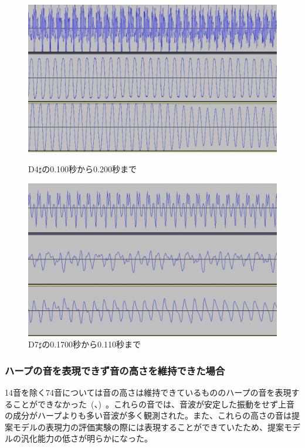 \begin{figure}[b]
\centering
\begin{minipage}[b]{0.48\columnwidth}
\centering
\includegraphics[width=0.85\columnwidth]{figure/66_22_det/d4s_0100_0200.png}
\caption[D4$\sharp$の音波]{D4$\sharp$の0.100秒から0.200秒まで}
\label{fig:66_22_near}
\end{minipage}
\begin{minipage}[b]{0.48\columnwidth}
\centering
\includegraphics[width=0.85\columnwidth]{figure/66_22_det/d7s_0100_0110.png}
\caption[D7$\sharp$の音波]{D7$\sharp$の0.1700秒から0.110秒まで}
\label{fig:66_22_bad4}
\end{minipage}
\end{figure}

\clearpage

\subsubsection{ハープの音を表現できず音の高さを維持できた場合}

14音を除く74音については音の高さは維持できているもののハープの音を表現することができなかった~(、)~。これらの音では、音波が安定した振動をせず上音の成分がハープよりも多い音波が多く観測された。また、これらの高さの音は提案モデルの表現力の評価実験の際には表現することができていたため、提案モデルの汎化能力の低さが明らかになった。

